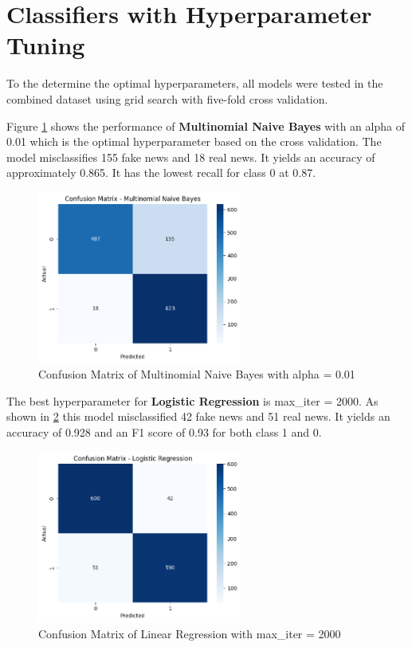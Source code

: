 \section{Classifiers with Hyperparameter Tuning}
\label{sec:ParamTuning}
To the determine the optimal hyperparameters, all models were tested in the combined dataset using grid search with five-fold cross validation.

Figure \ref{MNB_hyperparam} shows the performance of \textbf{Multinomial Naive Bayes} with an alpha of 0.01 which is the optimal hyperparameter based on the cross validation. The model misclassifies 155 fake news and 18 real news. It yields an accuracy of approximately 0.865. It has the lowest recall for class 0 at 0.87.

\begin{figure}[h!]
\centering
\includegraphics[width=0.6\textwidth,height=0.6\textheight, keepaspectratio]{figures/hyperparam/MNB.png}
    \caption{Confusion Matrix of Multinomial Naive Bayes with alpha = 0.01}
    \label{MNB_hyperparam}
\end{figure}

The best hyperparameter for \textbf{Logistic Regression} is max\_iter = 2000. As shown in \ref{LR_hyperparam} this model misclassified 42 fake news and 51 real news. It yields an accuracy of 0.928 and an F1 score of 0.93 for both class 1 and 0. 

\begin{figure}[h!]
\centering
\includegraphics[width=0.6\textwidth,height=0.6\textheight, keepaspectratio]{figures/hyperparam/LR.png}
    \caption{Confusion Matrix of Linear Regression with max\_iter = 2000}
    \label{LR_hyperparam}
\end{figure}

